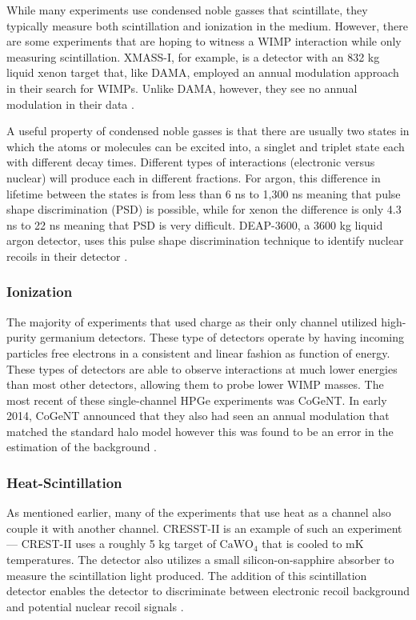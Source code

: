 While many experiments use condensed noble gasses that scintillate, they typically measure both scintillation and ionization in the medium.  However, there are some experiments that are hoping to witness a WIMP interaction while only measuring scintillation.  XMASS-I, for example, is a detector with an 832 kg liquid xenon target that, like DAMA, employed an annual modulation approach in their search for WIMPs.  Unlike DAMA, however, they see no annual modulation in their data \cite{xmass2016direct}.  

A useful property of condensed noble gasses is that there are usually two states in which the atoms or molecules can be excited into, a singlet and triplet state each with different decay times.  Different types of interactions (electronic versus nuclear) will produce each in different fractions.  For argon, this difference in lifetime between the states is from less than 6 ns to 1,300 ns \cite{heindl2011table} meaning that pulse shape discrimination (PSD) is possible, while for xenon the difference is only 4.3 ns to 22 ns meaning that PSD is very difficult.  DEAP-3600, a 3600 kg liquid argon detector, uses this pulse shape discrimination technique to identify nuclear recoils in their detector \cite{amaudruz2017first}.     


\subsubsection{Ionization}

The majority of experiments that used charge as their only channel utilized high-purity germanium detectors.  These type of detectors operate by having incoming particles free electrons in a consistent and linear fashion as function of energy.  These types of detectors are able to observe interactions at much lower energies than most other detectors, allowing them to probe lower WIMP masses.  The most recent of these single-channel HPGe experiments was CoGeNT.  In early 2014, CoGeNT announced that they also had seen an annual modulation that matched the standard halo model \cite{aalseth2014search} however this was found to be an error in the estimation of the background \cite{aalseth2014maximum}.


\subsubsection{Heat-Scintillation}

As mentioned earlier, many of the experiments that use heat as a channel also couple it with another channel.  CRESST-II is an example of such an experiment --- CREST-II uses a roughly 5 kg target of $\textrm{CaWO}_4$ that is cooled to mK temperatures.  The detector also utilizes a small silicon-on-sapphire absorber to measure the scintillation light produced.  The addition of this scintillation detector enables the detector to discriminate between electronic recoil background and potential nuclear recoil signals \cite{strauss2016exploring}.  

